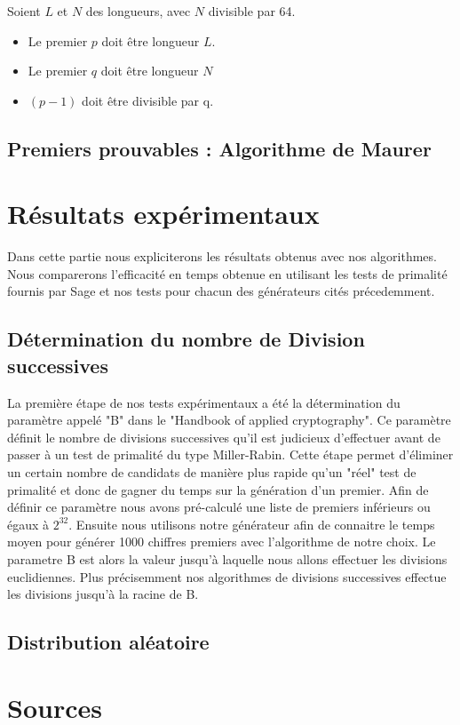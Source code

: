 \documentclass[a4paper,11pt]{article}
\begin{document}
Soient $L$ et $N$ des longueurs, avec $N$ divisible par 64.
\medbreak
\begin{itemize}
\item Le premier $p$ doit être longueur $L$.  
\item Le premier $q$ doit être longueur $N$
\item $(p-1)$ doit être divisible par q.
\end{itemize}


\subsection{Premiers prouvables : Algorithme de Maurer}

\section{Résultats expérimentaux}
Dans cette partie nous expliciterons les résultats obtenus avec nos algorithmes. Nous comparerons l'efficacité en temps obtenue en utilisant les tests de primalité fournis par Sage et nos tests pour chacun des générateurs cités précedemment.

\subsection{Détermination du nombre de Division successives}
La première étape de nos tests expérimentaux a été la détermination du paramètre appelé "B" dans le "Handbook of applied cryptography". Ce paramètre définit le nombre de divisions successives qu'il est judicieux d'effectuer avant de passer à un test de primalité du type Miller-Rabin. Cette étape permet d'éliminer un certain nombre de candidats de manière plus rapide qu'un "réel" test de primalité et donc de gagner du temps sur la génération d'un premier. 
\newline
Afin de définir ce paramètre nous avons pré-calculé une liste de premiers inférieurs ou égaux à $2^{32}$. Ensuite nous utilisons notre générateur afin de connaitre le temps moyen pour générer 1000 chiffres premiers avec l'algorithme de notre choix. Le parametre B est alors la valeur jusqu'à laquelle nous allons effectuer les divisions euclidiennes.
Plus précisemment nos algorithmes de divisions successives effectue les divisions jusqu'à la racine de B. 



\subsection{Distribution aléatoire}
\section*{Sources}




 
  
\end{document}
